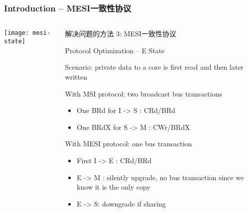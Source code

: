 \begin{frame}[plain]	
    \frametitle{Introduction -- MESI一致性协议}
    
    
    \begin{columns}
        
        \begin{column}{.4\textwidth}
            \texttt{[image: mesi-state]}
        \end{column}
        \begin{column}{.6\textwidth}
            解决问题的方法 3: MESI一致性协议
            
            Protocol Optimization – E State
            
            Scenario: private data to a core is first read and then later written
            
            With MSI protocol: two broadcast bus transactions
            \begin{itemize}				
                \item One BRd for I -> S :  CRd/BRd
                \item  One BRdX for S -> M : CWr/BRdX
            \end{itemize}
            
            With MESI protocol: one bus transaction
            \begin{itemize}	
                \item First I -> E  : CRd/BRd
                \item E -> M  : silently upgrade, no bus transaction since we know it is the only copy
                \item E -> S: downgrade if sharing				
            \end{itemize}		
            
        \end{column}
    \end{columns}
    
\end{frame}
